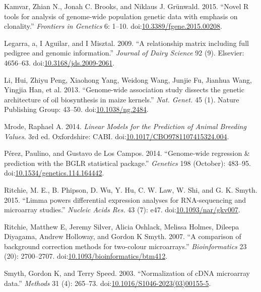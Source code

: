 \documentclass[]{elsarticle} %
\begin{document}
\hypertarget{ref-Kamvar2015}{}
Kamvar, Zhian N., Jonah C. Brooks, and Niklaus J. Grünwald. 2015.
``Novel R tools for analysis of genome-wide population genetic data with
emphasis on clonality.'' \emph{Frontiers in Genetics} 6: 1--10.
doi:\href{https://doi.org/10.3389/fgene.2015.00208}{10.3389/fgene.2015.00208}.

\hypertarget{ref-Legarra2009}{}
Legarra, a, I Aguilar, and I Misztal. 2009. ``A relationship matrix
including full pedigree and genomic information.'' \emph{Journal of
Dairy Science} 92 (9). Elsevier: 4656--63.
doi:\href{https://doi.org/10.3168/jds.2009-2061}{10.3168/jds.2009-2061}.

\hypertarget{ref-Li2013}{}
Li, Hui, Zhiyu Peng, Xiaohong Yang, Weidong Wang, Junjie Fu, Jianhua
Wang, Yingjia Han, et al. 2013. ``Genome-wide association study dissects
the genetic architecture of oil biosynthesis in maize kernels.''
\emph{Nat. Genet.} 45 (1). Nature Publishing Group: 43--50.
doi:\href{https://doi.org/10.1038/ng.2484}{10.1038/ng.2484}.

\hypertarget{ref-Mrode2014}{}
Mrode, Raphael A. 2014. \emph{Linear Models for the Prediction of Animal
Breeding Values}. 3rd ed. Oxfordshire: CABI.
doi:\href{https://doi.org/10.1017/CBO9781107415324.004}{10.1017/CBO9781107415324.004}.

\hypertarget{ref-Perez2014}{}
Pérez, Paulino, and Gustavo de Los Campos. 2014. ``Genome-wide
regression \& prediction with the BGLR statistical package.''
\emph{Genetics} 198 (October): 483--95.
doi:\href{https://doi.org/10.1534/genetics.114.164442}{10.1534/genetics.114.164442}.

\hypertarget{ref-Ritchie2015a}{}
Ritchie, M. E., B. Phipson, D. Wu, Y. Hu, C. W. Law, W. Shi, and G. K.
Smyth. 2015. ``Limma powers differential expression analyses for
RNA-sequencing and microarray studies.'' \emph{Nucleic Acids Res.} 43
(7): e47.
doi:\href{https://doi.org/10.1093/nar/gkv007}{10.1093/nar/gkv007}.

\hypertarget{ref-Ritchie2007}{}
Ritchie, Matthew E, Jeremy Silver, Alicia Oshlack, Melissa Holmes,
Dileepa Diyagama, Andrew Holloway, and Gordon K Smyth. 2007. ``A
comparison of background correction methods for two-colour
microarrays.'' \emph{Bioinformatics} 23 (20): 2700--2707.
doi:\href{https://doi.org/10.1093/bioinformatics/btm412}{10.1093/bioinformatics/btm412}.

\hypertarget{ref-Smyth2003}{}
Smyth, Gordon K, and Terry Speed. 2003. ``Normalization of cDNA
microarray data.'' \emph{Methods} 31 (4): 265--73.
doi:\href{https://doi.org/10.1016/S1046-2023(03)00155-5}{10.1016/S1046-2023(03)00155-5}.
\end{document}
